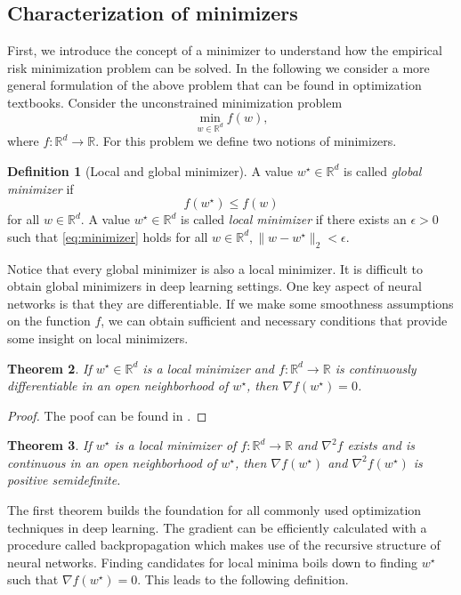 \documentclass[12pt]{article}
\newtheorem{theorem}{Theorem}[section]
\theoremstyle{definition}
\newtheorem{definition}[theorem]{Definition}
\numberwithin{equation}{section}
\newcommand{\norm}[1]{\lVert{#1}\rVert_2}
\begin{document}
\subsection{Characterization of minimizers}
First, we introduce the concept of a minimizer to understand how the empirical risk minimization problem can be solved. In the following we consider a more general formulation of the above problem that can be found in optimization textbooks. Consider the unconstrained minimization problem
\begin{equation}
  \min_{w \in \mathbb{R}^d} f(w),
\end{equation}
where $f:\mathbb{R}^d \rightarrow \mathbb{R}$.
For this problem we define two notions of minimizers.
\begin{definition}[Local and global minimizer]
  A value $w^\star \in \mathbb{R}^d$ is called \emph{global minimizer} if 
  \begin{equation}
    \label{eq:minimizer}
    f(w^\star) \leq f(w)
  \end{equation} 
  for all $w \in \mathbb{R}^d$. A value $w^\star \in \mathbb{R}^d$ is called \emph{local minimizer} if there exists an $\epsilon > 0$ such that \ref{eq:minimizer} holds for all $w \in \mathbb{R}^d, \norm{w-w^\star} < \epsilon$.
\end{definition}
Notice that every global minimizer is also a local minimizer. It is difficult to obtain global minimizers in deep learning settings. One key aspect of neural networks is that they are differentiable. If we make some smoothness assumptions on the function $f$, we can obtain sufficient and necessary conditions that provide some insight on local minimizers.
\begin{theorem}
  If $w^\star \in \mathbb{R}^d$ is a local minimizer and $f:\mathbb{R}^d \rightarrow \mathbb{R}$ is continuously differentiable in an open neighborhood of $w^\star$, then $\nabla f(w^\star) = 0$.
\end{theorem}
\begin{proof}
  The poof can be found in \autocite{nocedalNumericalOptimization2006}.
\end{proof}
\begin{theorem}
  If $w^\star$ is a local minimizer of $f : \mathbb{R}^d \rightarrow \mathbb{R}$ and $\nabla^2 f$ exists and is continuous in an open neighborhood of $w^\star$, then $\nabla f(w^\star)$ and $\nabla^2f(w^\star)$ is positive semidefinite.
\end{theorem}
The first theorem builds the foundation for all commonly used optimization techniques in deep learning. The gradient can be  efficiently calculated with a procedure called backpropagation which makes use of the recursive structure of neural networks. Finding candidates for local minima boils down to finding $w^\star$ such that $\nabla f(w^\star) = 0$. This leads to the following definition.
\end{document}
